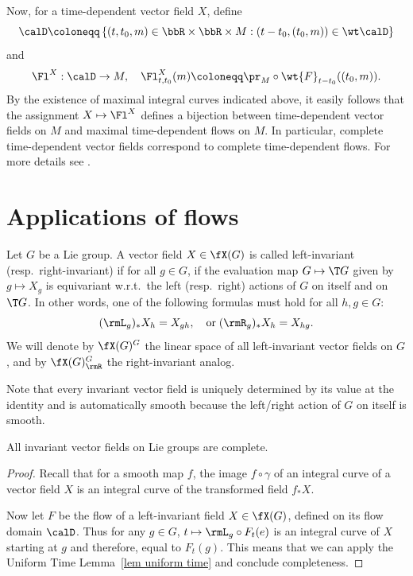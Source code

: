 \begin{rem}
    Now, for a time-dependent vector field $X$, define 
    \[\calD\coloneqq \left\{(t,t_0,m)\in\bbR\times\bbR\times M:(t-t_0,(t_0,m))\in\wt\calD\right\}\]
    and 
    \[\Fl^X:\calD\to M,\quad \Fl^X_{t,t_0}(m)\coloneqq \pr_M\circ \wt{F}_{t-t_0}((t_0,m)).\]
    By the existence of maximal integral curves indicated above, it easily follows that the assignment $X\mapsto \Fl^X$ defines a bijection between time-dependent vector fields on $M$ and maximal time-dependent flows on $M$. In particular, complete time-dependent vector fields correspond to complete time-dependent flows. For more details see \cite[Sec.~3.4]{RS1}.
\end{rem}













\section{Applications of flows}\label{sec: applications of flows}



\begin{defn}
    Let $G$ be a Lie group. A vector field $X\in\fX(G)$ is called left-invariant (resp.~right-invariant) if for all $g\in G$, if the evaluation map $G\mapsto \T G$ given by $g\mapsto X_g$ is equivariant w.r.t.\ the left (resp.~right) actions of $G$ on itself and on $\T G$. In other words, one of the following formulas must hold for all $h,g\in G$:
    \[(\rmL_g)_{\ast}X_h=X_{gh},\quad \text{or}\; (\rmR_g)_{\ast}X_h=X_{hg}.\]
    We will denote by $\fX(G)^G$ the linear space of all left-invariant vector fields on $G$, and by $\fX(G)^G_\rmR$ the right-invariant analog.
\end{defn}

Note that every invariant vector field is uniquely determined by its value at the identity and is automatically smooth because the left/right action of $G$ on itself is smooth.

\begin{thm}\label{thm invariant fields are complete}
    All invariant vector fields on Lie groups are complete.
\end{thm}
\begin{proof}
    Recall that for a smooth map $f$, the image $f\circ\gamma$ of an integral curve of a vector field $X$ is an integral curve of the transformed field $f_\ast X$. 
    
    Now let $F$ be the flow of a left-invariant field $X\in \fX(G)$, defined on its flow domain $\calD$. Thus for any $g\in G$, $t\mapsto \rmL_g\circ F_t(e)$ is an integral curve of $X$ starting at $g$ and therefore, equal to $F_t(g)$. This means that we can apply the Uniform Time Lemma~\ref{lem uniform time} and conclude completeness.
\end{proof}

